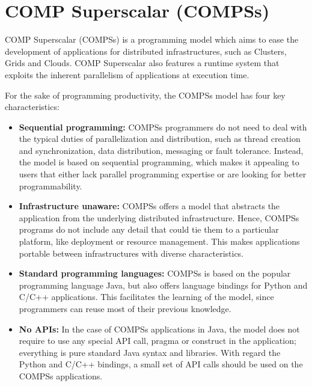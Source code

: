 \section{COMP Superscalar (COMPSs)}
\label{sec:Introduction}

COMP Superscalar (COMPSs) is a programming model which aims to ease the 
development of applications for distributed infrastructures, such as Clusters, 
Grids and Clouds. COMP Superscalar also features a runtime system that exploits 
the inherent parallelism of applications at execution time.

For the sake of programming productivity, the COMPSs model has four key 
characteristics:

\begin{itemize}
 
 \item  {\bf Sequential programming:} COMPSs programmers do not need to deal 
 with the typical duties of parallelization and distribution, such as thread 
 creation and synchronization, data distribution, messaging or fault tolerance. 
 Instead, the model is based on sequential programming, which makes it appealing 
 to users that either lack parallel programming expertise or are looking for 
 better programmability.
 
 \item  {\bf Infrastructure unaware:} COMPSs offers a model that abstracts the 
 application from the underlying distributed infrastructure. Hence, COMPSs 
 programs do not include any detail that could tie them to a particular 
 platform, like deployment or resource management. This makes applications 
 portable between infrastructures with diverse characteristics.
 
 \item  {\bf Standard programming languages:} COMPSs is based on the popular 
 programming language Java, but also offers language bindings for Python and 
 C/C++ applications. This facilitates the learning of the model, since 
 programmers can reuse most of their previous knowledge.
 
 \item  {\bf No APIs:} In the case of COMPSs applications in Java, the model 
 does not require to use any special API call, pragma or construct in the 
 application; everything is pure standard Java syntax and libraries. With 
 regard the Python and C/C++ bindings, a small set of API calls should be used 
 on the COMPSs applications.

\end{itemize}


